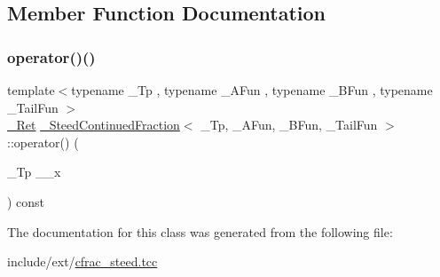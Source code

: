 \subsection{Member Function Documentation}
\mbox{\label{class__SteedContinuedFraction_aa435e7908e7a2bbef90ef9f8aad464aa}} 
\subsubsection{\texorpdfstring{operator()()}{operator()()}}
{\footnotesize\ttfamily template$<$typename \+\_\+\+Tp , typename \+\_\+\+A\+Fun , typename \+\_\+\+B\+Fun , typename \+\_\+\+Tail\+Fun $>$ \\
\hyperlink{class__SteedContinuedFraction_a9dc0b4a835f6e3c7495889da047a3706}{\+\_\+\+Ret} \hyperlink{class__SteedContinuedFraction}{\+\_\+\+Steed\+Continued\+Fraction}$<$ \+\_\+\+Tp, \+\_\+\+A\+Fun, \+\_\+\+B\+Fun, \+\_\+\+Tail\+Fun $>$\+::operator() (\begin{DoxyParamCaption}\item[{\+\_\+\+Tp}]{\+\_\+\+\_\+x }\end{DoxyParamCaption}) const\hspace{0.3cm}{\ttfamily [inline]}}



The documentation for this class was generated from the following file\+:\begin{DoxyCompactItemize}
\item 
include/ext/\hyperlink{cfrac__steed_8tcc}{cfrac\+\_\+steed.\+tcc}\end{DoxyCompactItemize}
